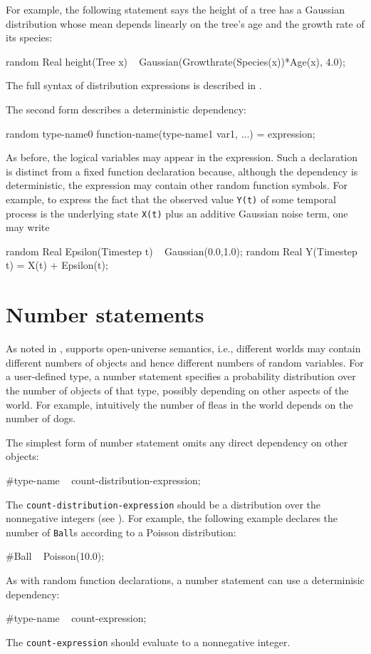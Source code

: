 \documentclass[12pt]{article}
\begin{document}
For example, the following statement says the height of a tree has a Gaussian distribution
whose mean depends linearly on the tree's age and the growth rate of its species:
\begin{blogcode}
random Real height(Tree x) ~ Gaussian(Growthrate(Species(x))*Age(x), 4.0);
\end{blogcode}
The full syntax of distribution expressions is described in .

The second form describes a deterministic dependency:
\begin{blogcode}
random type-name0 function-name(type-name1 var1, ...) = expression;
\end{blogcode}
As before, the logical variables may appear in the expression.
Such a declaration is distinct from a fixed function declaration because, although the dependency is deterministic,
the expression may contain other random function symbols. For example, 
to express the fact that the observed value {\tt Y(t)} of some temporal process 
is the underlying state {\tt X(t)} plus an additive Gaussian noise term, one may write
\begin{blogcode}
random Real Epsilon(Timestep t) ~ Gaussian(0.0,1.0);
random Real Y(Timestep t) = X(t) + Epsilon(t);
\end{blogcode}




\section{Number statements}\label{number-section}
As noted in , \bl supports open-universe semantics, i.e., different worlds may contain different numbers of objects and hence different numbers of random variables.
For a user-defined type, a number statement specifies a probability distribution over the number of objects of that type, possibly depending
on other aspects of the world. For example, intuitively the number of fleas in the world depends on the number of dogs.

The simplest form of number statement omits any direct dependency on other objects:
\begin{blogcode}
#type-name ~ count-distribution-expression;
\end{blogcode}
The {\tt count-distribution-expression} should be a distribution over
the nonnegative integers (see ).
For example, the following example declares the number of \texttt{Ball}s according to a Poisson distribution:
\begin{blogcode}
#Ball ~ Poisson(10.0);
\end{blogcode}
As with random function declarations, a number statement can use a determinisic dependency:
\begin{blogcode}
#type-name ~ count-expression;
\end{blogcode}
The {\tt count-expression} should evaluate to a nonnegative integer.
\end{document}
